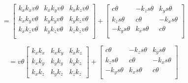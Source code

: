 \documentclass[a4paper]{article}
\begin{document}
\begin{qalist}
		\begin{equation} = 
				\left[ \begin{matrix} 
					\textit{${k}_{x}{k}_{x}v\theta$} & \textit{${k}_{x}{k}_{y}v\theta$} & \textit{${k}_{x}{k}_{z}v\theta$} \\
					\textit{${k}_{x}{k}_{y}v\theta$} & \textit{${k}_{y}{k}_{y}v\theta$} & \textit{${k}_{y}{k}_{z}v\theta$} \\
					\textit{${k}_{x}{k}_{z}v\theta$} & \textit{${k}_{y}{k}_{z}v\theta$} & \textit{${k}_{z}{k}_{z}v\theta$} \\
				\end{matrix} \right]
				+
				\left[ \begin{matrix} 
					\textit{$c\theta$} & \textit{$- {k}_{z}s\theta$} & \textit{${k}_{y}s\theta$} \\
					\textit{${k}_{z}s\theta$} & \textit{$c\theta$} & \textit{$- {k}_{x}s\theta$} \\
					\textit{$- {k}_{y}s\theta$} & \textit{${k}_{x}s\theta$} & \textit{$c\theta$} \\
				\end{matrix} \right]
		\end{equation}
		
		\begin{equation} = 
				v\theta\left[ \begin{matrix} 
					\textit{${k}_{x}{k}_{x}$} & \textit{${k}_{x}{k}_{y}$} & \textit{${k}_{x}{k}_{z}$} \\
					\textit{${k}_{x}{k}_{y}$} & \textit{${k}_{y}{k}_{y}$} & \textit{${k}_{y}{k}_{z}$} \\
					\textit{${k}_{x}{k}_{z}$} & \textit{${k}_{y}{k}_{z}$} & \textit{${k}_{z}{k}_{z}$} 
				\end{matrix} \right]
				+
				\left[ \begin{matrix} 
					\textit{$c\theta$} & \textit{$- {k}_{z}s\theta$} & \textit{${k}_{y}s\theta$} \\
					\textit{${k}_{z}s\theta$} & \textit{$c\theta$} & \textit{$- {k}_{x}s\theta$} \\
					\textit{$- {k}_{y}s\theta$} & \textit{${k}_{x}s\theta$} & \textit{$c\theta$} \\
				\end{matrix} \right]
		\end{equation}
		

\end{qalist}
\end{document}

